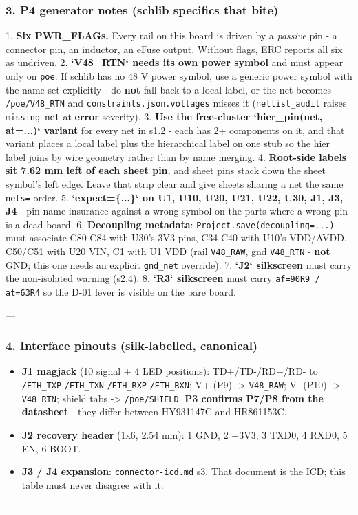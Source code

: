 \documentclass[11pt,a4paper]{article}
\begin{document}
\subsubsection*{3. P4 generator notes (schlib specifics that bite)}
1. \textbf{Six PWR\_FLAGs.} Every rail on this board is driven by a \emph{passive} pin - a connector pin, an inductor, an eFuse output. Without flags, ERC reports all six as undriven. 2. \textbf{`V48\_RTN` needs its own power symbol} and must appear only on \texttt{poe}. If schlib has no 48 V power symbol, use a generic power symbol with the name set explicitly - do \textbf{not} fall back to a local label, or the net becomes \texttt{/poe/V48\_RTN} and \texttt{constraints.json.voltages} misses it (\texttt{netlist\_audit} raises \texttt{missing\_net} at \textbf{error} severity). 3. \textbf{Use the free-cluster `hier\_pin(net, at=...)` variant} for every net in s1.2 - each has 2+ components on it, and that variant places a local label plus the hierarchical label on one stub so the hier label joins by wire geometry rather than by name merging. 4. \textbf{Root-side labels sit 7.62 mm left of each sheet pin}, and sheet pins stack down the sheet symbol's left edge. Leave that strip clear and give sheets sharing a net the same \texttt{nets=} order. 5. \textbf{`expect=\{...\}` on U1, U10, U20, U21, U22, U30, J1, J3, J4} - pin-name insurance against a wrong symbol on the parts where a wrong pin is a dead board. 6. \textbf{Decoupling metadata}: \texttt{Project.save(decoupling=...)} must associate C80-C84 with U30's 3V3 pins, C34-C40 with U10's VDD/AVDD, C50/C51 with U20 VIN, C1 with U1 VDD (rail \texttt{V48\_RAW}, gnd \texttt{V48\_RTN} - \textbf{not} GND; this one needs an explicit \texttt{gnd\_net} override). 7. \textbf{`J2` silkscreen} must carry the non-isolated warning (s2.4). 8. \textbf{`R3` silkscreen} must carry \texttt{af=90R9 / at=63R4} so the D-01 lever is visible on the bare board.

---

\subsubsection*{4. Interface pinouts (silk-labelled, canonical)}
\begin{itemize}
\item \textbf{J1 magjack} (10 signal + 4 LED positions): TD+/TD-/RD+/RD- to \texttt{/ETH\_TXP} \texttt{/ETH\_TXN}
\texttt{/ETH\_RXP} \texttt{/ETH\_RXN}; V+ (P9) -\textgreater{} \texttt{V48\_RAW}; V- (P10) -\textgreater{} \texttt{V48\_RTN}; shield tabs -\textgreater{} \texttt{/poe/SHIELD}.
\textbf{P3 confirms P7/P8 from the datasheet} - they differ between HY931147C and HR861153C.
\item \textbf{J2 recovery header} (1x6, 2.54 mm): 1 GND, 2 +3V3, 3 TXD0, 4 RXD0, 5 EN, 6 BOOT.
\item \textbf{J3 / J4 expansion}: \texttt{connector-icd.md} s3. That document is the ICD; this table must never
disagree with it.
\end{itemize}
---
\end{document}
